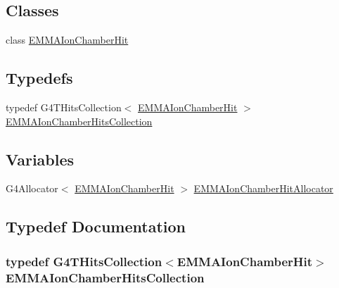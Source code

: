 \subsection*{Classes}
\begin{DoxyCompactItemize}
\item 
class \hyperlink{classEMMAIonChamberHit}{E\+M\+M\+A\+Ion\+Chamber\+Hit}
\end{DoxyCompactItemize}
\subsection*{Typedefs}
\begin{DoxyCompactItemize}
\item 
typedef G4\+T\+Hits\+Collection$<$ \hyperlink{classEMMAIonChamberHit}{E\+M\+M\+A\+Ion\+Chamber\+Hit} $>$ \hyperlink{EMMAIonChamberHit_8hh_aad7a65851c3a8c13578e1a75f0b2d717}{E\+M\+M\+A\+Ion\+Chamber\+Hits\+Collection}
\end{DoxyCompactItemize}
\subsection*{Variables}
\begin{DoxyCompactItemize}
\item 
G4\+Allocator$<$ \hyperlink{classEMMAIonChamberHit}{E\+M\+M\+A\+Ion\+Chamber\+Hit} $>$ \hyperlink{EMMAIonChamberHit_8hh_adb78e92d0fb21fc2a8a5f8f8d03805ea}{E\+M\+M\+A\+Ion\+Chamber\+Hit\+Allocator}
\end{DoxyCompactItemize}


\subsection{Typedef Documentation}
\subsubsection[{\texorpdfstring{E\+M\+M\+A\+Ion\+Chamber\+Hits\+Collection}{EMMAIonChamberHitsCollection}}]{\setlength{\rightskip}{0pt plus 5cm}typedef G4\+T\+Hits\+Collection$<${\bf E\+M\+M\+A\+Ion\+Chamber\+Hit}$>$ {\bf E\+M\+M\+A\+Ion\+Chamber\+Hits\+Collection}}\hypertarget{EMMAIonChamberHit_8hh_aad7a65851c3a8c13578e1a75f0b2d717}{}\label{EMMAIonChamberHit_8hh_aad7a65851c3a8c13578e1a75f0b2d717}


